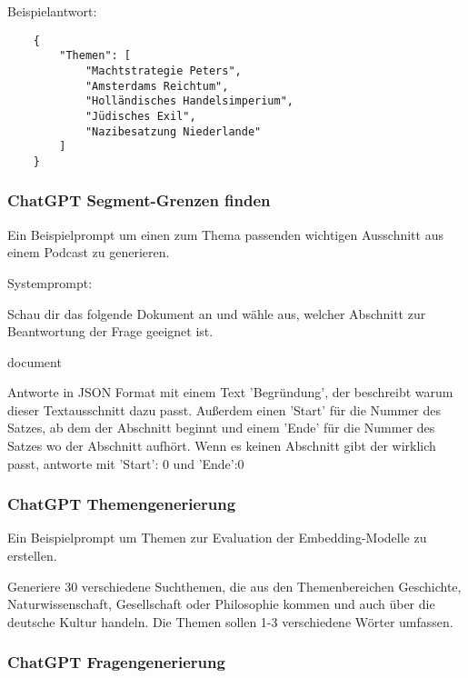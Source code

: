 Beispielantwort:

\begin{verbatim}
    {
        "Themen": [
            "Machtstrategie Peters",
            "Amsterdams Reichtum",
            "Holländisches Handelsimperium",
            "Jüdisches Exil",
            "Nazibesatzung Niederlande"
        ]
    }
\end{verbatim}


\label{ch:chatgpt-boundaries}
\subsubsection*{ChatGPT Segment-Grenzen finden}
Ein Beispielprompt um einen zum Thema passenden wichtigen Ausschnitt aus einem Podcast zu generieren.

Systemprompt:

\begin{itshape}
    Schau dir das folgende Dokument an und wähle aus, welcher Abschnitt zur Beantwortung der Frage geeignet ist.

    {document}

    Antworte in JSON Format mit einem Text 'Begründung', der beschreibt warum dieser Textausschnitt dazu passt. 
    Außerdem einen 'Start' für die Nummer des Satzes, ab dem der Abschnitt beginnt und 
    einem 'Ende' für die Nummer des Satzes wo der Abschnitt aufhört.
    Wenn es keinen Abschnitt gibt der wirklich passt, antworte mit 'Start': 0 und 'Ende':0

\end{itshape}


\label{ch:chatgpt-topicgeneration}
\subsubsection*{ChatGPT Themengenerierung}

Ein Beispielprompt um Themen zur Evaluation der Embedding-Modelle zu erstellen.

\begin{itshape}
Generiere 30 verschiedene Suchthemen, die aus den Themenbereichen Geschichte, Naturwissenschaft, Gesellschaft oder Philosophie kommen und auch über die deutsche Kultur handeln.
Die Themen sollen 1-3 verschiedene Wörter umfassen.
\end{itshape}

\label{ch:chatgpt-questiongeneration}

\subsubsection*{ChatGPT Fragengenerierung}


